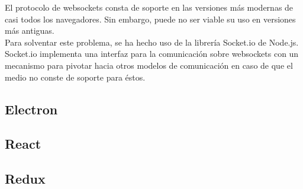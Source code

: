 El protocolo de websockets consta de soporte en las versiones más modernas de casi todos los navegadores. Sin embargo, puede no ser viable su uso en versiones más antiguas. \\

Para solventar este problema, se ha hecho uso de la librería Socket.io de Node.js. \\ 
Socket.io implementa una interfaz para la comunicación sobre websockets con un mecanismo para pivotar hacia otros modelos de comunicación en caso de que el medio no conste de soporte para éstos. \\
\subsection {Electron}
\subsection {React}
\subsection {Redux}